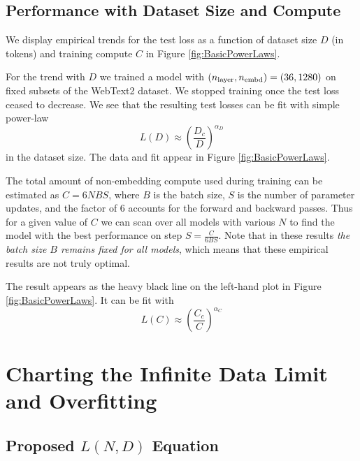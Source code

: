 \documentclass[english]{article}
\newcommand{\be}{\begin{equation}}
\newcommand{\ee}{\end{equation}}
\begin{document}
\subsection{Performance with Dataset Size and Compute}

We display empirical trends for the test loss as a function of dataset size $D$ (in tokens) and training compute $C$ in Figure \ref{fig:BasicPowerLaws}.    

For the trend with $D$ we trained a model with $(n_{\rm layer}, n_{\rm embd}) = (36, 1280)$ on fixed subsets of the WebText2 dataset.  We stopped training once the test loss ceased to decrease.  We see that the resulting test losses can be fit with simple power-law
\be
L(D) \approx \left( \frac{D_c}{D} \right)^{\alpha_D}
\ee
in the dataset size.  The data and fit appear in Figure \ref{fig:BasicPowerLaws}.

The total amount of non-embedding compute used during training can be estimated as $C = 6 N B S$, where $B$ is the batch size, $S$ is the number of parameter updates, and the factor of $6$ accounts for the forward and backward passes.  Thus for a given value of $C$ we can scan over all models with various $N$ to find the model with the best performance on step $S = \frac{C}{6 B S}$.  Note that in these results \emph{the batch size $B$ remains fixed for all models}, which means that these empirical results are not truly optimal.

The result appears as the heavy black line on the left-hand plot in Figure \ref{fig:BasicPowerLaws}.  It can  be fit with 
\be
L(C) \approx \left( \frac{C_c}{C} \right)^{\alpha_C}
\ee

\section{Charting the Infinite Data Limit and Overfitting}
\label{sec:ChartingOverfitting}

\subsection{Proposed $L(N,D)$ Equation}
\end{document}
